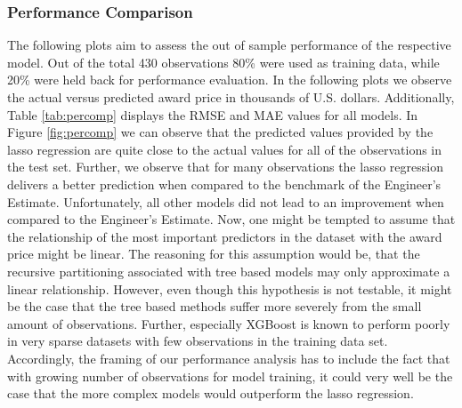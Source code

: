 \documentclass[a4paper,12pt, headsepline]{scrartcl}
\numberwithin{equation}{section}
\begin{document}
\subsubsection{Performance Comparison}
The following plots aim to assess the out of sample performance of the respective model. Out of the total 430 observations 80\% were used as training data, while 20\% were held back for performance evaluation. In the following plots we observe the actual versus predicted award price in thousands of U.S. dollars. Additionally, Table \ref{tab:percomp} displays the RMSE and MAE values for all models. In Figure \ref{fig:percomp} we can observe that the predicted values provided by the lasso regression are quite close to the actual values for all of the observations in the test set. Further, we observe that for many observations the lasso regression delivers a better prediction when compared to the benchmark of the Engineer's Estimate. Unfortunately, all other models did not lead to an improvement when compared to the Engineer's Estimate. Now, one might be tempted to assume that the relationship of the most important predictors in the dataset with the award price might be linear. The reasoning for this assumption would be, that the recursive partitioning associated with tree based models may only approximate a linear relationship. However, even though this hypothesis is not testable, it might be the case that the tree based methods suffer more severely from the small amount of observations. Further, especially XGBoost is known to perform poorly in very sparse datasets with few observations in the training data set. Accordingly, the framing of our performance analysis has to include the fact that with growing number of observations for model training, it could very well be the case that the more complex models would outperform the lasso regression. 
\end{document}
